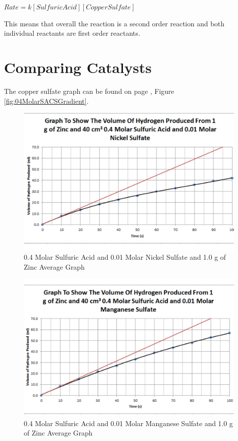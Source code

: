 $Rate = k [Sulfuric Acid] [Copper Sulfate]$

This means that overall the reaction is a second order reaction and both individual reactants are first order reactants.














\section{Comparing Catalysts}

The copper sulfate graph can be found on page \pageref{fig:04MolarSACSGradient}, Figure \ref{fig:04MolarSACSGradient}.

\begin{figure}[H]
    \includegraphics[width=\textwidth]{./Analysis/Images/4DifferentCatalysts/Nickel.pdf}
    \caption{0.4 Molar Sulfuric Acid and 0.01 Molar Nickel Sulfate and 1.0 g of Zinc Average Graph} \label{fig:NickelGradient}
\end{figure}

\begin{figure}[H]
    \includegraphics[width=\textwidth]{./Analysis/Images/4DifferentCatalysts/Manganese.pdf}
    \caption{0.4 Molar Sulfuric Acid and 0.01 Molar Manganese Sulfate and 1.0 g of Zinc Average Graph} \label{fig:ManganeseGradient}
\end{figure}

